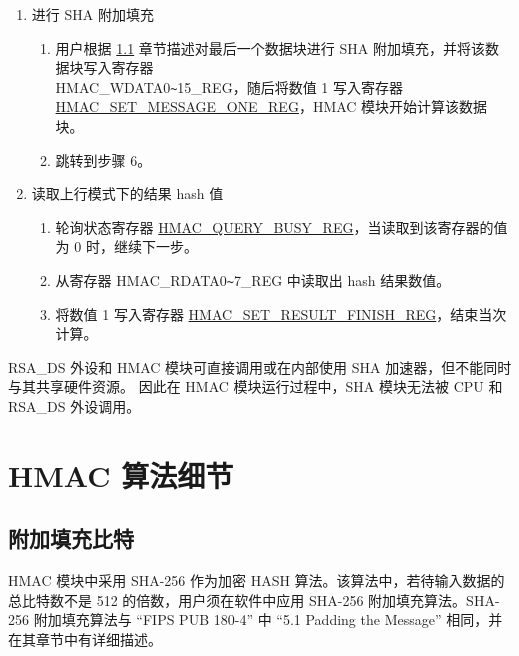 \documentclass[main\_\_CN.tex]{subfiles}
\begin{document}
\begin{enumerate}
\begin{enumerate}
\begin{itemize}
\begin{enumerate}
                    \item 如果 Block\_\textcolor{red}{n} 既不是最后一个也不是倒数第二个数据块，将数值 1 写入寄存器 \\\hyperref[regdesc:HMACSETMESSAGEINGREG]{HMAC\_SET\_MESSAGE\_ING\_REG}，令$n=n+1$，随后跳转到步骤 4.(b)。
                \end{enumerate}
            \end{itemize}
        \end{enumerate}

    \item 进行 SHA 附加填充
    \begin{enumerate}
        \item 用户根据 \ref{hmac_padding} 章节描述对最后一个数据块进行 SHA 附加填充，并将该数据块写入寄存器\\ HMAC\_WDATA0\verb+~+15\_REG，随后将数值 1 写入寄存器 \hyperref[regdesc:HMACSETMESSAGEONEREG]{HMAC\_SET\_MESSAGE\_ONE\_REG}，HMAC 模块开始计算该数据块。
        \item 跳转到步骤 6。
    \end{enumerate}

    \item 读取上行模式下的结果 hash 值
    \begin{enumerate}
        \item 轮询状态寄存器 \hyperref[regdesc:HMACQUERYBUSYREG]{HMAC\_QUERY\_BUSY\_REG}，当读取到该寄存器的值为 0 时，继续下一步。
        \item 从寄存器 HMAC\_RDATA0\verb+~+7\_REG 中读取出 hash 结果数值。
        \item 将数值 1 写入寄存器 \hyperref[regdesc:HMACSETRESULTFINISHREG]{HMAC\_SET\_RESULT\_FINISH\_REG}，结束当次计算。
    \end{enumerate}

\end{enumerate}

\begin{tiplisting}
\label{hmac_tips_2}
    RSA\_DS 外设和 HMAC 模块可直接调用或在内部使用 SHA 加速器，但不能同时与其共享硬件资源。
    因此在 HMAC 模块运行过程中，SHA 模块无法被 CPU 和 RSA\_DS 外设调用。
\end{tiplisting}

\section{HMAC 算法细节}

\subsection{附加填充比特}
\label{hmac_padding}
HMAC 模块中采用 SHA-256 作为加密 HASH 算法。该算法中，若待输入数据的总比特数不是 512 的倍数，用户须在软件中应用 SHA-256 附加填充算法。SHA-256 附加填充算法与 “FIPS PUB 180-4” 中 “5.1 Padding the Message” 相同，并在其章节中有详细描述。
\end{document}
